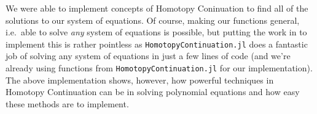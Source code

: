 \documentclass[11pt]{article}
\begin{document}
We were able to implement concepts of Homotopy Coninuation to find all
of the solutions to our system of equations. Of course, making our
functions general, i.e.~able to solve \emph{any} system of equations is
possible, but putting the work in to implement this is rather pointless
as \texttt{HomotopyContinuation.jl} does a fantastic job of solving any
system of equations in just a few lines of code (and we're already using
functions from \texttt{HomotopyContinuation.jl} for our implementation).
The above implementation shows, however, how powerful techniques in
Homotopy Continuation can be in solving polynomial equations and how
easy these methods are to implement.


    
    
    
\end{document}
